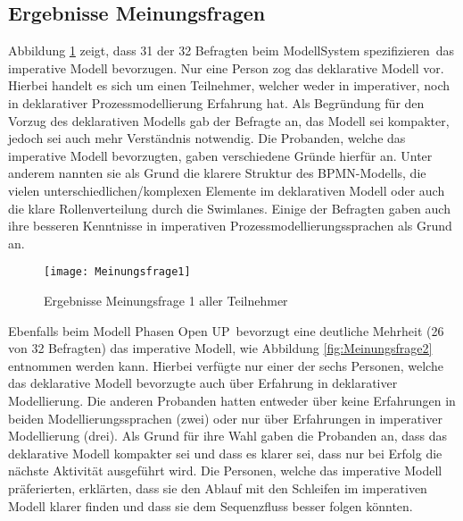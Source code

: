 \subsection{Ergebnisse Meinungsfragen}

Abbildung \ref{fig:Meinungsfrage1} zeigt, dass 31 der 32 Befragten beim Modell\grqq System spezifizieren\grqq \ das imperative Modell bevorzugen. Nur eine Person zog das deklarative Modell vor. Hierbei handelt es sich um einen Teilnehmer, welcher weder in imperativer, noch in deklarativer Prozessmodellierung Erfahrung hat. Als Begründung für den Vorzug des deklarativen Modells gab der Befragte an, das Modell sei kompakter, jedoch sei auch mehr Verständnis notwendig.\newline
Die Probanden, welche das imperative Modell bevorzugten, gaben verschiedene Gründe hierfür an. Unter anderem nannten sie als Grund die klarere Struktur des BPMN-Modells, die vielen unterschiedlichen/komplexen Elemente im deklarativen Modell oder auch die klare Rollenverteilung durch die Swimlanes. Einige der Befragten gaben auch ihre besseren Kenntnisse in imperativen Prozessmodellierungssprachen als Grund an.\newline

\begin{figure}[htp]
\begin{center}
  \texttt{[image: Meinungsfrage1]} %
  \caption{Ergebnisse Meinungsfrage 1 aller Teilnehmer}
  \label{fig:Meinungsfrage1}
\end{center}
\end{figure}

Ebenfalls beim Modell \grqq Phasen Open UP\grqq \ bevorzugt eine deutliche Mehrheit (26 von 32 Befragten) das imperative Modell, wie Abbildung \ref{fig:Meinungsfrage2} entnommen werden kann. \newline
Hierbei verfügte nur einer der sechs Personen, welche das deklarative Modell bevorzugte auch über Erfahrung in deklarativer Modellierung. Die anderen Probanden hatten entweder über keine Erfahrungen in beiden Modellierungssprachen (zwei) oder nur über Erfahrungen in imperativer Modellierung (drei). Als Grund für ihre Wahl gaben die Probanden an, dass das deklarative Modell kompakter sei und dass es klarer sei, dass nur bei Erfolg die nächste Aktivität ausgeführt wird.\newline
Die Personen, welche das imperative Modell präferierten, erklärten, dass sie den Ablauf mit den Schleifen im imperativen Modell klarer finden und dass sie dem Sequenzfluss besser folgen könnten.\newline


